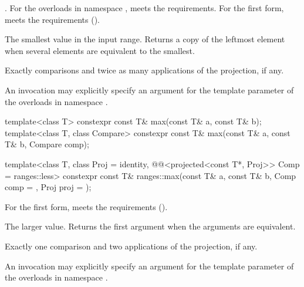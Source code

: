 \begin{itemdescr}
\pnum
\expects
{}.
For the overloads in namespace ,
 meets the  requirements.
For the first form,  meets the 
requirements ().

\pnum
\returns
The smallest value in the input range.
Returns a copy of the leftmost element
when several elements are equivalent to the smallest.

\pnum
\complexity
Exactly  comparisons
and twice as many applications of the projection, if any.

\pnum
\remarks
An invocation may explicitly specify
an argument for the template parameter 
of the overloads in namespace .
\end{itemdescr}

%
\begin{itemdecl}
template<class T>
  constexpr const T& max(const T& a, const T& b);
template<class T, class Compare>
  constexpr const T& max(const T& a, const T& b, Compare comp);

template<class T, class Proj = identity,
         @@<projected<const T*, Proj>> Comp = ranges::less>
  constexpr const T& ranges::max(const T& a, const T& b, Comp comp = {}, Proj proj = {});
\end{itemdecl}

\begin{itemdescr}
\pnum
\expects
For the first form,  meets the
 requirements ().

\pnum
\returns
The larger value.
Returns the first argument when the arguments are equivalent.

\pnum
\complexity
Exactly one comparison and two applications of the projection, if any.

\pnum
\remarks
An invocation may explicitly specify
an argument for the template parameter 
of the overloads in namespace .
\end{itemdescr}

